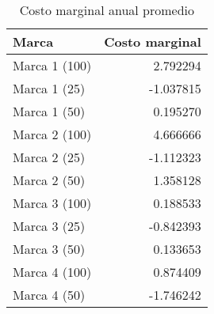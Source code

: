 \begin{table}
\centering
\caption{Costo marginal anual promedio}
\begin{tabular}{lr}
\toprule
         Marca &  Costo marginal \\
\midrule
 Marca 1 (100) &        2.792294 \\
  Marca 1 (25) &       -1.037815 \\
  Marca 1 (50) &        0.195270 \\
 Marca 2 (100) &        4.666666 \\
  Marca 2 (25) &       -1.112323 \\
  Marca 2 (50) &        1.358128 \\
 Marca 3 (100) &        0.188533 \\
  Marca 3 (25) &       -0.842393 \\
  Marca 3 (50) &        0.133653 \\
 Marca 4 (100) &        0.874409 \\
  Marca 4 (50) &       -1.746242 \\
\bottomrule
\end{tabular}
\end{table}

